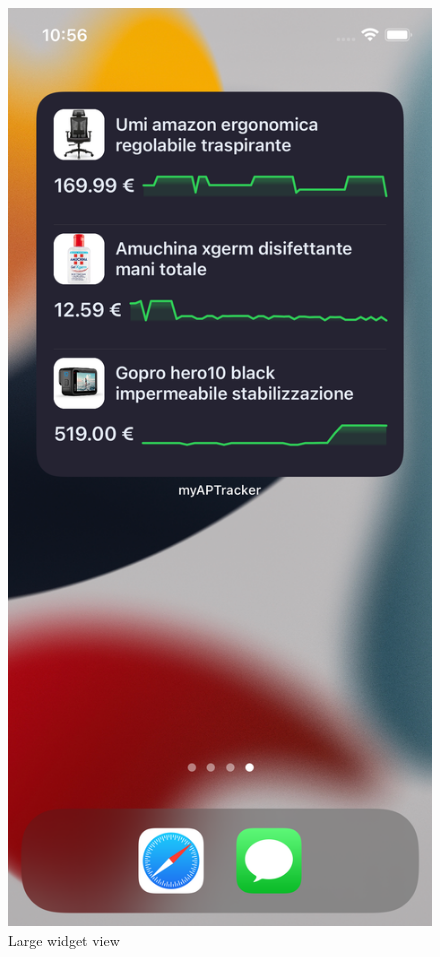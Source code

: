 \begin{figure}[h!]
        \centering
        \includegraphics[scale=0.15]{images/interfaces/large_widget_view.png}
        \caption{Large widget view}
        \label{fig:large_widget_view}
\end{figure}
\FloatBarrier

